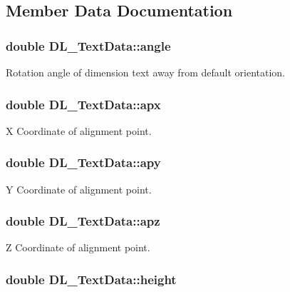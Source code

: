 \subsection{Member Data Documentation}
\hypertarget{structDL__TextData_aa7c12bd998270c2310c8a79ccd5a74db}{
\subsubsection[{angle}]{\setlength{\rightskip}{0pt plus 5cm}double D\-L\-\_\-\-Text\-Data\-::angle}}\label{structDL__TextData_aa7c12bd998270c2310c8a79ccd5a74db}
Rotation angle of dimension text away from default orientation. \hypertarget{structDL__TextData_a5890898e18ac055d368125aeda0cef87}{
\subsubsection[{apx}]{\setlength{\rightskip}{0pt plus 5cm}double D\-L\-\_\-\-Text\-Data\-::apx}}\label{structDL__TextData_a5890898e18ac055d368125aeda0cef87}
X Coordinate of alignment point. \hypertarget{structDL__TextData_a37f3b9363f4ae438b79e4db2ffab6c99}{
\subsubsection[{apy}]{\setlength{\rightskip}{0pt plus 5cm}double D\-L\-\_\-\-Text\-Data\-::apy}}\label{structDL__TextData_a37f3b9363f4ae438b79e4db2ffab6c99}
Y Coordinate of alignment point. \hypertarget{structDL__TextData_a552719cafe56851862bfcbfedbcc478e}{
\subsubsection[{apz}]{\setlength{\rightskip}{0pt plus 5cm}double D\-L\-\_\-\-Text\-Data\-::apz}}\label{structDL__TextData_a552719cafe56851862bfcbfedbcc478e}
Z Coordinate of alignment point. \hypertarget{structDL__TextData_acb99be867dd22ca2f31ced7f4ff23ce3}{
\subsubsection[{height}]{\setlength{\rightskip}{0pt plus 5cm}double D\-L\-\_\-\-Text\-Data\-::height}}\label{structDL__TextData_acb99be867dd22ca2f31ced7f4ff23ce3}
